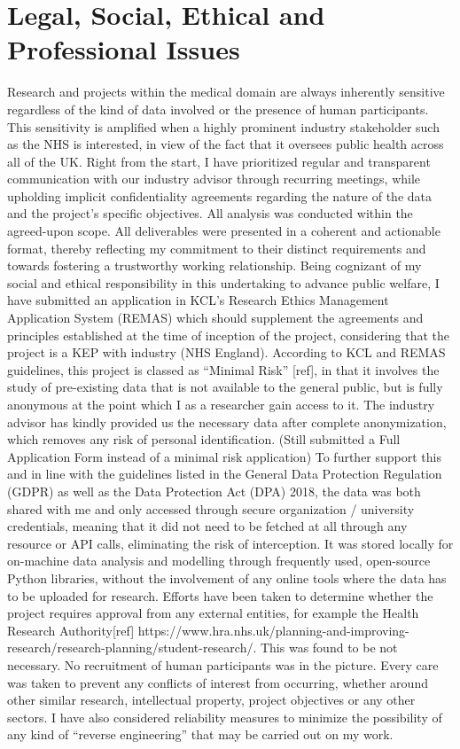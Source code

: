 \section{Legal, Social, Ethical and Professional Issues}

Research and projects within the medical domain are always inherently sensitive regardless of the kind of data involved or the presence of human participants. This sensitivity is amplified when a highly prominent industry stakeholder such as the NHS is interested, in view of the fact that it oversees public health across all of the UK. Right from the start, I have prioritized regular and transparent communication with our industry advisor through recurring meetings, while upholding implicit confidentiality agreements regarding the nature of the data and the project’s specific objectives. All analysis was conducted within the agreed-upon scope. All deliverables were presented in a coherent and actionable format, thereby reflecting my commitment to their distinct requirements and towards fostering a trustworthy working relationship.
Being cognizant of my social and ethical responsibility in this undertaking to advance public welfare, I have submitted an application in KCL’s Research Ethics Management Application System (REMAS) which should supplement the agreements and principles established at the time of inception of the project, considering that the project is a KEP with industry (NHS England). According to KCL and REMAS guidelines, this project is classed as “Minimal Risk” [ref], in that it involves the study of pre-existing data that is not available to the general public, but is fully anonymous at the point which I as a researcher gain access to it. The industry advisor has kindly provided us the necessary data after complete anonymization, which removes any risk of personal identification. (Still submitted a Full Application Form instead of a minimal risk application)
To further support this and in line with the guidelines listed in the General Data Protection Regulation (GDPR) as well as the Data Protection Act (DPA) 2018, the data was both shared with me and only accessed through secure organization / university credentials, meaning that it did not need to be fetched at all through any resource or API calls, eliminating the risk of interception. It was stored locally for on-machine data analysis and modelling through frequently used, open-source Python libraries, without the involvement of any online tools where the data has to be uploaded for research.
Efforts have been taken to determine whether the project requires approval from any external entities, for example the Health Research Authority[ref] https://www.hra.nhs.uk/planning-and-improving-research/research-planning/student-research/. This was found to be not necessary. No recruitment of human participants was in the picture. Every care was taken to prevent any conflicts of interest from occurring, whether around other similar research, intellectual property, project objectives or any other sectors. I have also considered reliability measures to minimize the possibility of any kind of “reverse engineering” that may be carried out on my work. 
